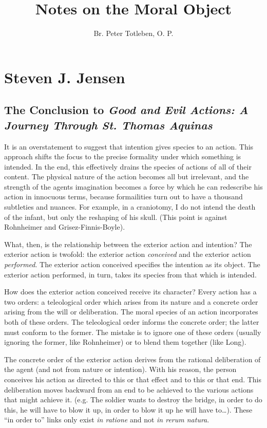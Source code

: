 \documentclass{article}
\title{Notes on the Moral Object}
\author{Br. Peter Totleben, O. P.}
\date{}
\begin{document}
\maketitle


\section{Steven J. Jensen}

\subsection{The Conclusion to \emph{Good and Evil Actions:  A Journey Through St. Thomas Aquinas}}

It is an overstatement to suggest that intention gives species to an action.  This approach shifts the focus to the
precise formality under which something is intended.  In the end, this effectively drains the species of actions of all
of their content.  The physical nature of the action becomes all but irrelevant, and the strength of the agents
imagination becomes a force by which he can redescribe his action in innocuous terms, because formailities turn out to
have a thousand subtleties and nuances.  For example, in a craniotomy, I do not intend the death of the infant, but only
the reshaping of his skull.  (This point is against Rohnheimer and Grisez-Finnis-Boyle).

What, then, is the relationship between the exterior action and intention?  The exterior action is twofold:  the
exterior action \emph{conceived} and the exterior action \emph{performed}.  The exterior action conceived specifies the
intention as its object.  The exterior action performed, in turn, takes its species from that which is intended.

How does the exterior action conceived receive its character?  Every action has a two orders:  a teleological order
which arises from its nature and a concrete order arising from the will or deliberation.  The moral species of an action
incorporates both of these orders.  The teleological order informs the concrete order; the latter must conform to the
former.  The mistake is to ignore one of these orders (usually ignoring the former, like Rohnheimer) or to blend them
together (like Long).

The concrete order of the exterior action derives from the rational deliberation of the agent (and not from nature or
intention).  With his reason, the person conceives his action as directed to this or that effect and to this or that
end.  This deliberation moves backward from an end to be achieved to the various actions that might achieve it.  (e.g. The
soldier wants to destroy the bridge, in order to do this, he will have to blow it up, in order to blow it up he will
have to\ldots).  These ``in order to'' links only exist \emph{in ratione} and not \emph{in rerum natura}.
\end{document}
